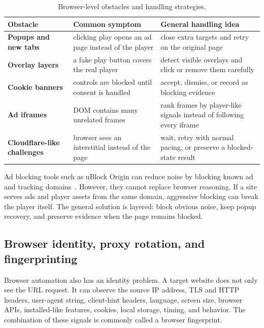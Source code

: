 \begin{table}[!htbp]
\centering
\begin{tabularx}{\textwidth}{>{\raggedright\arraybackslash\bfseries}p{3.1cm}
                              >{\raggedright\arraybackslash}X
                              >{\raggedright\arraybackslash}X}
\toprule
\rowcolor{accent!8}
Obstacle & Common symptom & General handling idea \\ \midrule
Popups and new tabs & clicking play opens an ad page instead of the player & close
extra targets and retry on the original page \\
Overlay layers & a fake play button covers the real player & detect visible overlays
and click or remove them carefully \\
Cookie banners & controls are blocked until consent is handled & accept, dismiss, or
record as blocking evidence \\
Ad iframes & DOM contains many unrelated frames & rank frames by player-like signals
instead of following every iframe \\
Cloudflare-like challenges & browser sees an interstitial instead of the page & wait,
retry with normal pacing, or preserve a blocked-state result \\
\bottomrule
\end{tabularx}
\caption{Browser-level obstacles and handling strategies.}\label{tab:browser-obstacles}
\end{table}

Ad blocking tools such as uBlock Origin can reduce noise by blocking known ad and
tracking domains~\cite{ublock}. However, they cannot replace browser reasoning. If a
site serves ads and player assets from the same domain, aggressive blocking can break
the player itself. The general solution is layered: block obvious noise, keep popup
recovery, and preserve evidence when the page remains blocked.

\subsection{Browser identity, proxy rotation, and fingerprinting}

Browser automation also has an identity problem. A target website does not only see the
URL request. It can observe the source IP address, TLS and HTTP headers, user-agent
string, client-hint headers, language, screen size, browser APIs, installed-like
features, cookies, local storage, timing, and behavior. The combination of these
signals is commonly called a browser fingerprint.

